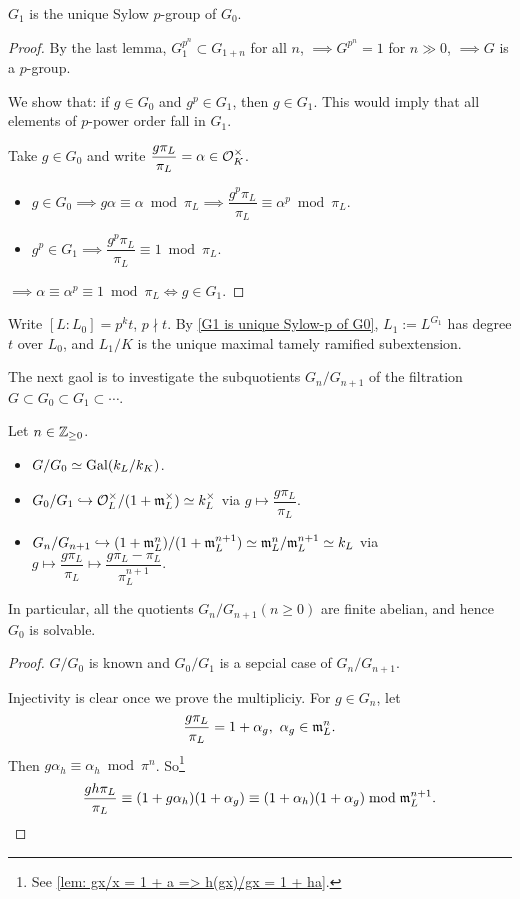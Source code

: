 \begin{proposition}\label{G1 is unique Sylow-p of G0}
    $G_1$ is the unique Sylow $p$-group of $G_0$.
\end{proposition}
\begin{proof}
    By the last lemma,
    $G_1^{p^n}\subset G_{1 + n}$ for all $n$,
    $\implies G^{p^n} = 1$ for $n\gg 0$,
    $\implies G$ is a $p$-group.

    We show that: if $g\in G_0$ and $g^p\in G_1$,
    then $g\in G_1$.
    This would imply that all elements of $p$-power order fall in $G_1$.

    Take $g\in G_0$ and write $\dfrac{g\pi_L}{\pi_L} = \alpha\in\mathcal{O}_K^\times$.
    \begin{itemize}
\item $g\in G_0\implies g\alpha\equiv\alpha\bmod\pi_L\implies \dfrac{g^p\pi_L}{\pi_L}\equiv \alpha^p\bmod\pi_L$.
\item $g^p\in G_1\implies \dfrac{g^p\pi_L}{\pi_L}\equiv 1\bmod\pi_L$.
    \end{itemize}
    $\implies \alpha\equiv \alpha^p \equiv 1\bmod\pi_L\iff g\in G_1$.
\end{proof}

Write $[L : L_0] = p^kt$, $p\nmid t$.
By \cref{G1 is unique Sylow-p of G0},
$L_1 := L^{G_1}$ has degree $t$ over $L_0$, and $L_1/K$ is the unique maximal tamely ramified subextension.

The next gaol is to investigate the subquotients $G_n/G_{n+1}$ of the filtration $G\subset G_0\subset G_1\subset\cdots$.

\begin{proposition}\label{subquotients of lower ramification filtration}
    Let $n\in \mathbb{Z}_{\ge 0}$.
\begin{itemize}
    \item $G/G_0\simeq\operatorname{Gal}(k_L/k_K)$.
    \item $G_0/G_1\hookrightarrow \mathcal{O}_L^\times/(1 + \mathfrak{m}_L^\times)\simeq k_L^\times$ via $g\mapsto \dfrac{g\pi_L }{\pi_L } $.
    \item $G_n/G_{n+1}\hookrightarrow (1 + \mathfrak{m}_L^n)/(1 + \mathfrak{m}_L^{n+1})\simeq \mathfrak{m}_L^n/\mathfrak{m}_L^{n+1}\simeq k_L$ via $g\mapsto \dfrac{g\pi_L }{\pi_L } \mapsto \dfrac{g\pi_L - \pi_L}{\pi_L^{n+1}}$.
\end{itemize}
In particular, all the quotients $G_n/G_{n+1}(n\ge 0)$ are finite abelian, and hence $G_0$ is solvable.
\end{proposition}
\begin{proof}
    $G/G_0$ is known and $G_0/G_1$ is a sepcial case of $G_n/G_{n+1}$.

    Injectivity is clear once we prove the multipliciy.
    For $g\in G_n$, let \[\frac{g\pi_L}{\pi_L} = 1 + \alpha_g,\ \alpha_g\in\m_L^n.\]
    Then $g\alpha_h \equiv\alpha_h\bmod \pi^n$.
    So\footnote{See \ref{lem: gx/x = 1 + a => h(gx)/gx = 1 + ha}.}
     \[
    \dfrac{gh\pi_L}{\pi_L} \equiv (1 + g\alpha_h)(1 + \alpha_g)\equiv (1 + \alpha_h)(1 + \alpha_g)\bmod\mathfrak{m}_L^{n+1}.\qedhere
    \]
\end{proof}



